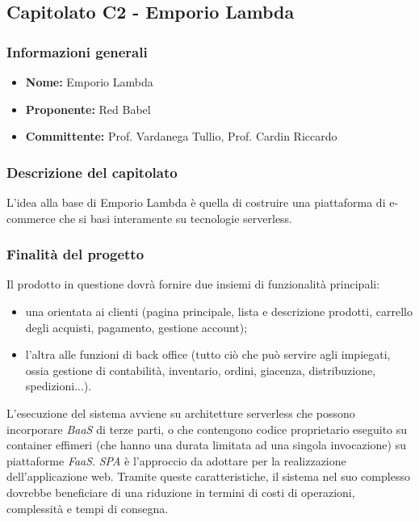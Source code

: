 \subsection{Capitolato C2 - Emporio Lambda}


\subsubsection{Informazioni generali}

\begin{itemize}
	\item{\textbf{Nome:}} Emporio Lambda
	\item{\textbf{Proponente:}} Red Babel
	\item{\textbf{Committente:}} Prof. Vardanega Tullio, Prof. Cardin Riccardo
\end{itemize}



\subsubsection{Descrizione del capitolato}

L'idea alla base di Emporio Lambda è quella di costruire una piattaforma di e-commerce che si basi interamente su tecnologie serverless.


\subsubsection{Finalità del progetto}

Il prodotto in questione dovrà fornire due insiemi di funzionalità principali: 
\begin{itemize}
	\item una orientata ai clienti (pagina principale, lista e descrizione prodotti, carrello degli acquisti, pagamento, gestione account);
	\item l'altra alle funzioni di back office (tutto ciò che può servire agli impiegati, ossia gestione di contabilità, inventario, ordini, giacenza, distribuzione, spedizioni...).
\end{itemize}

L'esecuzione del sistema avviene su architetture serverless che possono incorporare \textit{BaaS} di terze parti, o che contengono codice proprietario eseguito su container effimeri (che hanno una durata limitata ad una singola invocazione) su piattaforme \textit{FaaS}. \textit{SPA} è l'approccio da adottare per la realizzazione dell'applicazione web. Tramite queste caratteristiche, il sistema nel suo complesso dovrebbe beneficiare di una riduzione in termini di costi di operazioni, complessità e tempi di consegna.


